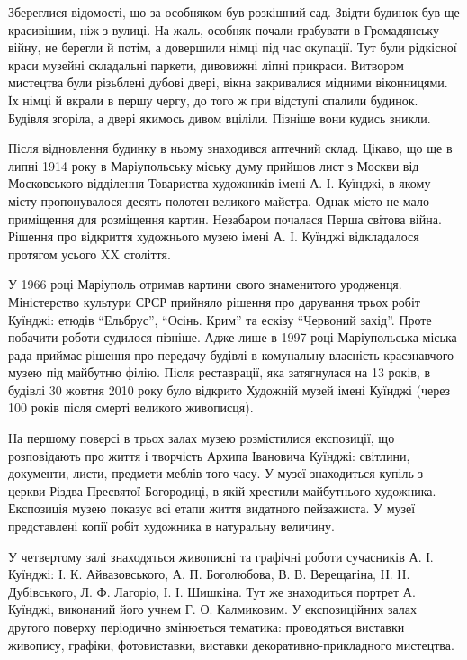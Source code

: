 Збереглися відомості, що за особняком був розкішний сад. Звідти будинок був ще
красивішим, ніж з вулиці. На жаль, особняк почали грабувати в Громадянську
війну, не берегли й потім, а довершили німці під час окупації. Тут були
рідкісної краси музейні складальні паркети, дивовижні ліпні прикраси. Витвором
мистецтва були різьблені дубові двері, вікна закривалися мідними віконницями.
Їх німці й вкрали в першу чергу, до того ж при відступі спалили будинок.
Будівля згоріла, а двері якимось дивом вціліли. Пізніше вони кудись зникли.

Після відновлення будинку в ньому знаходився аптечний склад. Цікаво, що ще в
липні 1914 року в Маріупольську міську думу прийшов лист з Москви від
Московського відділення Товариства художників імені А. І. Куїнджі, в якому
місту пропонувалося десять полотен великого майстра. Однак місто не мало
приміщення для розміщення картин. Незабаром почалася Перша світова війна.
Рішення про відкриття художнього музею імені А. І. Куїнджі відкладалося
протягом усього XX століття.

У 1966 році Маріуполь отримав картини свого знаменитого уродженця. Міністерство
культури СРСР прийняло рішення про дарування трьох робіт Куїнджі: етюдів
\enquote{Ельбрус}, \enquote{Осінь. Крим} та ескізу \enquote{Червоний захід}. Проте побачити роботи
судилося пізніше. Адже лише в 1997  році Маріупольська міська рада приймає
рішення про передачу будівлі в комунальну власність краєзнавчого музею під
майбутню філію. Після реставрації, яка затягнулася на 13 років, в будівлі 30
жовтня 2010 року було відкрито Художній музей імені Куїнджі (через 100 років
після смерті великого живописця).


На першому поверсі в трьох залах музею розмістилися експозиції, що розповідають
про життя і творчість Архипа Івановича Куїнджі: світлини, документи, листи,
предмети меблів того часу. У музеї знаходиться купіль з церкви Різдва Пресвятої
Богородиці, в якій хрестили майбутнього художника. Експозиція музею показує всі
етапи життя видатного пейзажиста. У музеї представлені копії робіт художника в
натуральну величину.


У четвертому залі знаходяться живописні та графічні роботи сучасників А. І.
Куїнджі: І. К. Айвазовського, А. П. Боголюбова, В. В. Верещагіна, Н. Н.
Дубівського, Л. Ф. Лагоріо, І. І. Шишкіна. Тут же знаходиться портрет А.
Куїнджі, виконаний його учнем Г. О. Калмиковим. У експозиційних залах другого
поверху періодично змінюється тематика: проводяться виставки живопису, графіки,
фотовиставки, виставки декоративно-прикладного мистецтва.

